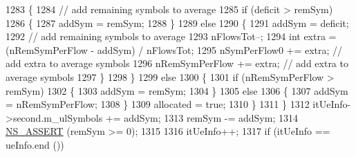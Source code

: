 \begin{DoxyCode}
1283                                         \{
1284                                                 \textcolor{comment}{// add remaining symbols to average}
1285                                                 \textcolor{keywordflow}{if} (deficit > remSym)
1286                                                 \{
1287                                                         addSym = remSym;
1288                                                 \}
1289                                                 \textcolor{keywordflow}{else}
1290                                                 \{
1291                                                         addSym = deficit;
1292                                                         \textcolor{comment}{// add remaining symbols to average}
1293                                                         nFlowsTot--;
1294                                                         \textcolor{keywordtype}{int} extra = (nRemSymPerFlow - addSym) / nFlowsTot;
1295                                                         nSymPerFlow0 += extra;  \textcolor{comment}{// add extra to average
       symbols}
1296                                                         nRemSymPerFlow += extra;  \textcolor{comment}{// add extra to average
       symbols}
1297                                                 \}
1298                                         \}
1299                                         \textcolor{keywordflow}{else}
1300                                         \{
1301                                                 \textcolor{keywordflow}{if} (nRemSymPerFlow > remSym)
1302                                                 \{
1303                                                         addSym = remSym;
1304                                                 \}
1305                                                 \textcolor{keywordflow}{else}
1306                                                 \{
1307                                                         addSym = nRemSymPerFlow;
1308                                                 \}
1309                                                 allocated = \textcolor{keyword}{true};
1310                                         \}
1311                                 \}
1312                                 itUeInfo->second.m\_ulSymbols += addSym;
1313                                 remSym -= addSym;
1314                                 \hyperlink{assert_8h_a6dccdb0de9b252f60088ce281c49d052}{NS\_ASSERT} (remSym >= 0);
1315 
1316                                 itUeInfo++;
1317                                 \textcolor{keywordflow}{if} (itUeInfo == ueInfo.end ())

\end{DoxyCode}
